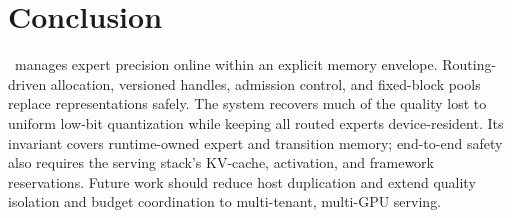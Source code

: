 \section{Conclusion}

\systemname\ manages expert precision online within an explicit memory envelope. Routing-driven allocation, versioned handles, admission control, and fixed-block pools replace representations safely. The system recovers much of the quality lost to uniform low-bit quantization while keeping all routed experts device-resident. Its invariant covers runtime-owned expert and transition memory; end-to-end safety also requires the serving stack's KV-cache, activation, and framework reservations. Future work should reduce host duplication and extend quality isolation and budget coordination to multi-tenant, multi-GPU serving.
